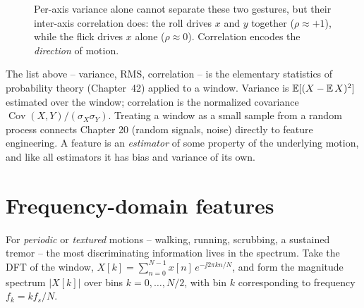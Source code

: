 \begin{figure}[H]
\centering
{}
\caption{Per-axis variance alone cannot separate these two gestures, but their
inter-axis correlation does: the roll drives $x$ and $y$ together
($\rho \approx +1$), while the flick drives $x$ alone ($\rho \approx 0$).
Correlation encodes the \emph{direction} of motion.}
\label{ch38:fig-corr}
\end{figure}

\begin{connectionbox}
The list above -- variance, RMS, correlation -- is the elementary statistics of
probability theory (Chapter~42) applied to a window. Variance is
$\operatorname{\mathbb{E}}[(X-\operatorname{\mathbb{E}} X)^2]$ estimated over the window; correlation is the normalized
covariance $\operatorname{Cov}(X,Y)/(\sigma_X\sigma_Y)$. Treating a window as a
small sample from a random process connects Chapter 20 (random signals, noise)
directly to feature engineering. A feature is
an \emph{estimator} of some property of the underlying motion, and like all
estimators it has bias and variance of its own.
\end{connectionbox}

\section{Frequency-domain features}
\label{ch38:freq-features}

For \emph{periodic} or \emph{textured} motions -- walking, running, scrubbing, a
sustained tremor -- the most discriminating information lives in the spectrum.
Take the DFT of the window, $X[k] = \sum_{n=0}^{N-1} x[n]\,e^{-\jj 2\pi kn/N}$, and
form the magnitude spectrum $|X[k]|$ over bins $k = 0,\dots,N/2$, with bin $k$
corresponding to frequency $f_k = k f_s / N$.


